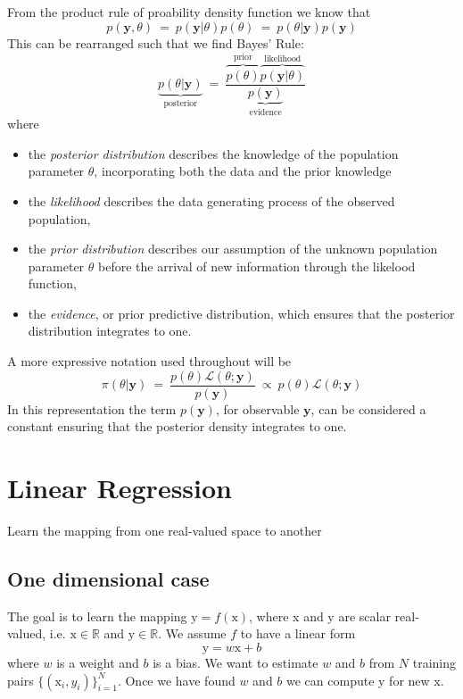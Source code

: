 \documentclass[11pt]{article}
\theoremstyle{plain}
\theoremstyle{definition}
\begin{document}
From the product rule of proability density function we know that
\begin{equation}
p(\textbf{y}, \theta) \ = \  p(\textbf{y}| \theta) p(\theta) \ = \ p(\theta|\textbf{y}) p(\textbf{y})
\end{equation}
This can be rearranged such that we find Bayes' Rule:
\begin{equation}
\underbrace{p(\theta|\textbf{y})}_{\text{posterior}} \ = \  \frac{\overbrace{p(\theta)}^{\text{prior}} \overbrace{p(\textbf{y}| \theta)}^{\text{likelihood}} }{ \underbrace{p(\textbf{y})}_{\text{evidence}}}
\end{equation}
where
\begin{itemize}
	\item the \textit{posterior distribution} describes the knowledge of the population parameter $\theta$, incorporating both the data and the prior knowledge
	\item the \textit{likelihood} describes the data generating process of the observed population,
	\item the \textit{prior distribution} describes our assumption of the unknown population parameter $\theta$ before the arrival of new information through the likelood function,
	\item the \textit{evidence}, or prior predictive distribution, which ensures that the posterior distribution integrates to one.
\end{itemize}
A more expressive notation used throughout will be
\begin{equation}
\pi(\theta|\textbf{y}) \ = \ \frac{p(\theta)\mathcal{L}(\theta;\textbf{y})}{p(\textbf{y})} \ \propto \ p(\theta)\mathcal{L}(\theta;\textbf{y})
\end{equation}
In this representation the term $p(\textbf{y})$, for observable $\textbf{y}$, can be considered a constant ensuring that the posterior density integrates to one.

\section{Linear Regression}
Learn the mapping from one real-valued space to another

\subsection{One dimensional case}
The goal is to learn the mapping $\text{y}=f(\text{x})$, where x and y are scalar real-valued, i.e. $\text{x} \in \mathbb{R}$ and $\text{y} \in \mathbb{R}$. We assume $f$ to have a linear form
\begin{equation}
	\text{y}=w\text{x}+b
\end{equation}
where $w$ is a weight and $b$ is a bias. We want to estimate $w$ and $b$ from $N$ training pairs $\{ (\text{x}_i, y_i)\}_{i=1}^N$. Once we have found $w$ and $b$ we can compute y for new x.
\end{document}
